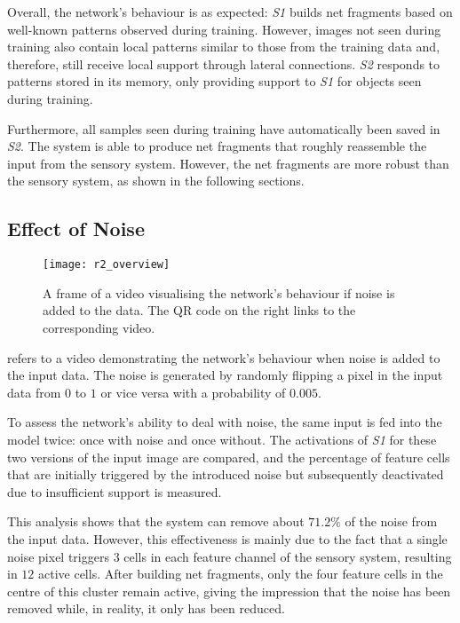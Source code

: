 Overall, the network's behaviour is as expected: \emph{S1} builds net fragments based on well-known patterns observed during training.
However, images not seen during training also contain local patterns similar to those from the training data and, therefore, still receive local support through lateral connections.
\emph{S2} responds to patterns stored in its memory, only providing support to \emph{S1} for objects seen during training.

Furthermore, all samples seen during training have automatically been saved in \emph{S2}.
The system is able to produce net fragments that roughly reassemble the input from the sensory system.
However, the net fragments are more robust than the sensory system, as shown in the following sections.

\subsection{Effect of Noise}
%
\begin{figure}[h]
    \centering
    \texttt{[image: r2\_overview]}
    \caption[Video visualising the network's behaviour with noise in input]{A frame of a video visualising the network's behaviour if noise is added to the data. The QR code on the right links to the corresponding video.}
\end{figure}
%
 refers to a video demonstrating the network's behaviour when noise is added to the input data.
The noise is generated by randomly flipping a pixel in the input data from $0$ to $1$ or vice versa with a probability of $0.005$.

To assess the network's ability to deal with noise, the same input is fed into the model twice: once with noise and once without. The activations of \emph{S1} for these two versions of the input image are compared, and the percentage of feature cells that are initially triggered by the introduced noise but subsequently deactivated due to insufficient support is measured.

This analysis shows that the system can remove about $71.2\%$ of the noise from the input data. However, this effectiveness is mainly due to the fact that a single noise pixel triggers $3$ cells in each feature channel of the sensory system, resulting in $12$ active cells. After building net fragments, only the four feature cells in the centre of this cluster remain active, giving the impression that the noise has been removed while, in reality, it only has been reduced.

